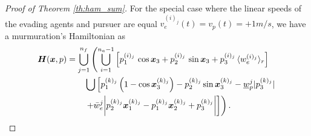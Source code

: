 \begin{proof}[Proof of Theorem \ref{th:ham_sum}]
For the special case where the linear speeds of the evading agents and pursuer are equal \ie $v_e^{(i)_j}(t) = v_p(t) = +1 m/s$, we have a murmuration's Hamiltonian as 
%
\begin{align}
	\bm{H}(\bm{x}, p) & = \bigcup_{j=1}^{n_f} \left( \bigcup_{i=1}^{n_a-1} 
	\left[p_1^{(i)_j} \,  \cos \bm{x}_3 + p_2^{(i)_j} \,  \sin \bm{x}_3 + p_3^{(i)_j}\, \langle w_e^{(i)_j}\rangle_r\right] \right.\nonumber \\
	& \qquad \left. \bigcup \left[
	p_1^{(k)_j} \left(1 - \cos \bm{x}_3^{(k)_j}\right) - p_2^{(k)_j} \sin \bm{x}_3^{(k)_j} - \underline{w}_p^j |p_3^{(k)_j}|   \right. \right. \nonumber \\
	& \qquad \left.  \left. 
	+ \bar{w}_e^j \bigg|p_2^{(k)_j} \bm{x}_1^{(k)_j} - p_1^{(k)_j}\bm{x}_2^{(k)_j} + p_3^{(k)_j}\bigg|
	\right] \right).
\end{align}
\end{proof}